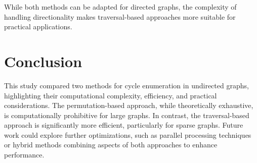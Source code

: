 \documentclass{sbc2023}%
\begin{document}
While both methods can be adapted for directed graphs, the complexity of handling directionality makes traversal-based approaches more suitable for practical applications.

\section{Conclusion}

This study compared two methods for cycle enumeration in undirected graphs, highlighting their computational complexity, efficiency, and practical considerations. The permutation-based approach, while theoretically exhaustive, is computationally prohibitive for large graphs. In contrast, the traversal-based approach is significantly more efficient, particularly for sparse graphs. Future work could explore further optimizations, such as parallel processing techniques or hybrid methods combining aspects of both approaches to enhance performance.

\cite{ref1}
\cite{ref2}
\cite{ref3}

\printbibliography[title={References}]
\end{document}
